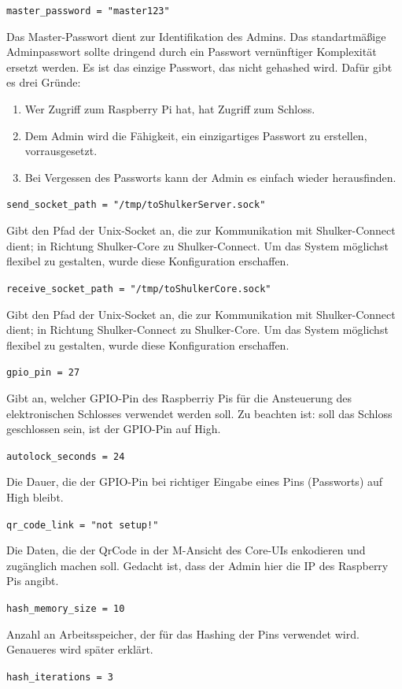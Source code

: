\lstinline{master_password = "master123"}

Das Master-Passwort dient zur Identifikation des Admins. Das standartmäßige Adminpasswort sollte dringend durch 
ein Passwort vernünftiger Komplexität ersetzt werden. Es ist das einzige Passwort, das nicht gehashed wird. Dafür
gibt es drei Gründe: 
\begin{enumerate}
    \item Wer Zugriff zum Raspberry Pi hat, hat Zugriff zum Schloss.
    \item Dem Admin wird die Fähigkeit, ein einzigartiges Passwort zu erstellen, vorrausgesetzt.
    \item Bei Vergessen des Passworts kann der Admin es einfach wieder herausfinden. 
\end{enumerate}

\lstinline{send_socket_path = "/tmp/toShulkerServer.sock"}

Gibt den Pfad der Unix-Socket an, die zur Kommunikation mit Shulker-Connect dient; in Richtung Shulker-Core zu Shulker-Connect.
Um das System möglichst flexibel zu gestalten, wurde diese Konfiguration erschaffen.

\lstinline{receive_socket_path = "/tmp/toShulkerCore.sock"}

Gibt den Pfad der Unix-Socket an, die zur Kommunikation mit Shulker-Connect dient; in Richtung Shulker-Connect zu Shulker-Core.
Um das System möglichst flexibel zu gestalten, wurde diese Konfiguration erschaffen.

\lstinline{gpio_pin = 27}

Gibt an, welcher GPIO-Pin des Raspberriy Pis für die Ansteuerung des elektronischen Schlosses verwendet werden soll. Zu beachten ist:
soll das Schloss geschlossen sein, ist der GPIO-Pin auf High.

\lstinline{autolock_seconds = 24}

Die Dauer, die der GPIO-Pin bei richtiger Eingabe eines Pins (Passworts) auf High bleibt.

\lstinline{qr_code_link = "not setup!"}

Die Daten, die der QrCode in der M-Ansicht des Core-UIs enkodieren und zugänglich machen soll. Gedacht ist, dass der
Admin hier die IP des Raspberry Pis angibt.

\lstinline{hash_memory_size = 10}

Anzahl an Arbeitsspeicher, der für das Hashing der Pins verwendet wird. Genaueres wird später erklärt.

\lstinline{hash_iterations = 3}

